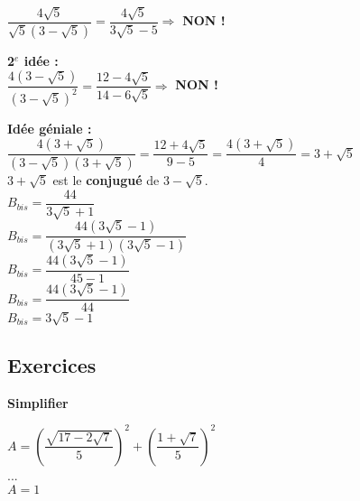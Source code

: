 $ \dfrac{4\sqrt{5}}{\sqrt{5}\left(3-\sqrt{5}\right)} = \dfrac{4\sqrt{5}}{3\sqrt{5}-5} \Longrightarrow $ \textbf{NON !} \\
 
 
\vspace{1cm}


 \textbf{2$^{e}$ idée :}\\
 
$ \dfrac{4\left(3-\sqrt{5}\right)}{\left(3-\sqrt{5}\right)^2} = \dfrac{12 - 4\sqrt{5}}{14-6\sqrt{5}} \Longrightarrow $ \textbf{NON !} \\


\vspace{1cm}

\textbf{Idée géniale :} \\

$ \dfrac{4\left(3+\sqrt{5}\right)}{\left(3-\sqrt{5}\right) \left(3+\sqrt{5}\right)} = \dfrac{12+ 4\sqrt{5}}{9 - 5} = \dfrac{4\left(3+\sqrt{5}\right)}{4} = 3 + \sqrt{5} $ \\
 
$ 3 + \sqrt{5} $ est le \textbf{conjugué} de $ 3 - \sqrt{5} $. \\

$ B_{bis} = \dfrac{44}{3\sqrt{5} + 1} $ \\

$ B_{bis} = \dfrac{44\left(3\sqrt{5}-1\right)}{\left(3\sqrt{5} + 1\right)\left(3\sqrt{5}-1\right)} $ \\

$ B_{bis} = \dfrac{44\left(3\sqrt{5}-1\right)}{45-1} $ \\

$ B_{bis} = \dfrac{44\left(3\sqrt{5}-1\right)}{44} $ \\

$ B_{bis} = 3\sqrt{5} -1 $ \\

\newpage

\subsection{Exercices}

\textbf{Simplifier}

$ A = \left(\dfrac{\sqrt{17-2\sqrt{7}}}{5}\right)^2 + \left(\dfrac{1 + \sqrt{7}}{5}\right)^2 $ \\

... \\

$ A = 1 $ \\

